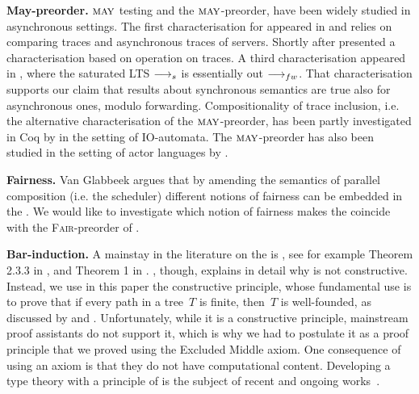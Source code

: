 {\bfseries May-preorder.} %
  $\May$ testing and the $\May$-preorder, have been widely studied in 
  asynchronous settings. The first characterisation for \ACCS appeared 
  in \cite{DBLP:conf/fsttcs/CastellaniH98} and relies on comparing traces
  and asynchronous traces of servers. Shortly after
  \cite{DBLP:journals/iandc/BorealeNP02} presented a characterisation based
  on operation on traces.
  A third characterisation appeared in \cite{DBLP:conf/birthday/BaldanBGV15},
  where the saturated LTS $\mathrel{\overset{}\longrightarrow}_s$ is essentially out $\sta{}$.
  That characterisation supports our claim that results about synchronous
  semantics are true also for asynchronous ones, modulo forwarding.
  Compositionality of trace inclusion, i.e. the alternative
  characterisation of the $\May$-preorder, 
  has been partly investigated in Coq by \cite{aathalye-meng} in the
  setting of IO-automata.
  The $\May$-preorder has also been studied in the setting of actor languages
  by \cite{caruana19,Tanti2015TowardsSR}.

{\bfseries Fairness.} 
Van Glabbeek \cite{DBLP:conf/fossacs/Glabbeek23} argues that by amending the
semantics of parallel composition (i.e. the scheduler) different
notions of fairness can be embedded in the \mustpreorder. We would like to investigate
which notion of fairness makes the \mustpreorder coincide with the 
\textsc{Fair}-preorder of \cite{DBLP:journals/iandc/RensinkV07}.



{\bfseries Bar-induction.}
A mainstay in the literature on the \mustpreorder is \koenigslemma, see
for example Theorem 2.3.3 in \cite{TCD-CS-2010-13}, and Theorem 1 in
\cite{DBLP:journals/scp/BernardiF18}. \cite{dummett2000elements}, though,
explains in detail why \koenigslemma is not constructive.
%
Instead, we use in this paper the constructive \barinduction principle, whose
fundamental use is to prove that if every path in a tree~$T$ is finite, then~$T$
is well-founded, as discussed by
\cite{DBLP:conf/aplas/NakataUB11,DBLP:conf/lics/BredeH21} and
\cite{kleene1965foundations}.
%
Unfortunately, while it is a constructive principle, mainstream proof assistants
do not support it, which is why we had to postulate it as a proof principle that
we proved using the Excluded Middle axiom. One consequence of using an axiom is
that they do not have computational content.
%
Developing a type theory with a principle of \barinduction is the subject of
recent and ongoing works~\cite{DBLP:conf/types/Fridlender98,DBLP:journals/jacm/RahliBCC19}.


